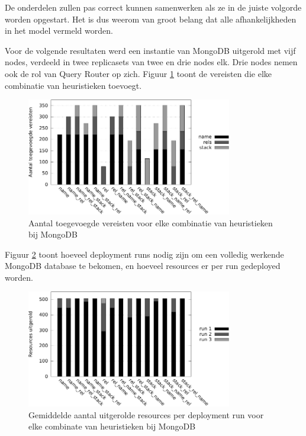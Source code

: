 De onderdelen zullen pas correct kunnen samenwerken als ze in de juiste volgorde worden opgestart.
Het is dus weerom  van groot belang dat alle afhankelijkheden in het model
vermeld worden.

Voor de volgende resultaten werd een instantie van MongoDB uitgerold met vijf nodes, verdeeld in twee replicasets van twee en drie nodes elk.
Drie nodes nemen ook de rol van Query Router op zich.
Figuur \ref{fig:reqs_mongo} toont de vereisten die elke combinatie van heuristieken toevoegt.

\begin{figure}[h]
    \begin{center}
    \includegraphics[width=0.8\textwidth]{images/reqs_mongo.pdf}
    \caption{Aantal toegevoegde vereisten voor elke combinatie van heuristieken bij MongoDB}
    \label{fig:reqs_mongo}
    \end{center}
\end{figure}

Figuur \ref{fig:time_runs_mongo} toont hoeveel deployment runs nodig zijn om een volledig werkende MongoDB database te bekomen, en hoeveel resources er
per run gedeployed worden.

\begin{figure}[h]
    \begin{center}
    \includegraphics[width=0.8\textwidth]{images/time_runs_mongo.pdf}
    \caption{Gemiddelde aantal uitgerolde resources per deployment run voor elke combinate van heuristieken bij MongoDB}
    \label{fig:time_runs_mongo}
    \end{center}
\end{figure}
